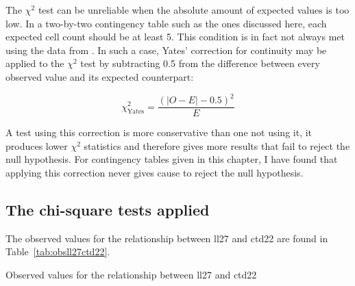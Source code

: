 
The \(\chi^2\) test can be unreliable when the absolute amount of expected values is too low. In a two-by-two contingency table such as the ones discussed here, each expected cell count should be at least 5. This condition is in fact not always met using the data from . In such a case, Yates' correction for continuity may be applied to the \(\chi^2\) test by subtracting 0.5 from the difference between every observed value and its expected counterpart:

\[\chi_\text{Yates}^2 =  \frac{(|O - E| - 0.5)^2}{E}\]

A test using this correction is more conservative than one not using it, \ie it produces lower \(\chi^2\) statistics and therefore gives more results that fail to reject the null hypothesis. For contingency tables given in this chapter, I have found that applying this correction never gives cause to reject the null hypothesis.

\subsection{The chi-square tests applied}
\label{sec:chisqapplied}

The observed values for the relationship between \gls{ll27} and \gls{ctd22} are found in Table~\ref{tab:obsll27ctd22}. 

\begin{table}[h]
  \centering
  
  \caption{Observed values for the relationship between \gls{ll27} and \gls{ctd22}}
  \label{tab:obsll27ctd22}
\end{table}



